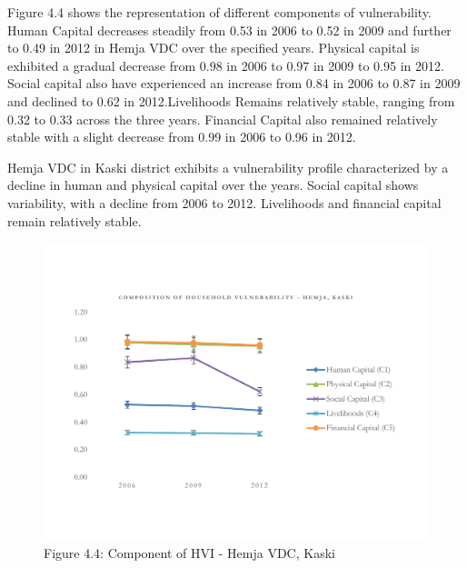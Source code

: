 \documentclass[12pt, a4paper]{article}
\begin{document}
Figure 4.4 shows the representation of different components of vulnerability. Human Capital decreases steadily from 0.53 in 2006 to 0.52 in 2009 and further to 0.49 in 2012 in Hemja VDC over the specified years. Physical capital is exhibited a gradual decrease from 0.98 in 2006 to 0.97 in 2009 to 0.95 in 2012. Social capital also have experienced an increase from 0.84 in 2006 to 0.87 in 2009 and declined to 0.62 in 2012.Livelihoods Remains relatively stable, ranging from 0.32 to 0.33 across the three years. Financial Capital also remained relatively stable with a slight decrease from 0.99 in 2006 to 0.96 in 2012. 

Hemja VDC in Kaski district exhibits a vulnerability profile characterized by a decline in human and physical capital over the years. Social capital shows variability, with a decline from 2006 to 2012. Livelihoods and financial capital remain relatively stable. 
\begin{figure}[ht]
	\vspace{-50pt}
	\includegraphics[scale=0.6]{HVI_Component_Hemja1.pdf}
		\captionsetup{labelformat=empty}
			\vspace{-50pt} %
	\caption{Figure 4.4: Component of HVI - Hemja VDC, Kaski}
	\setlength{\abovecaptionskip}{4pt}
	\label{fig:hvihemjacomponent}
\end{figure}
\end{document}
